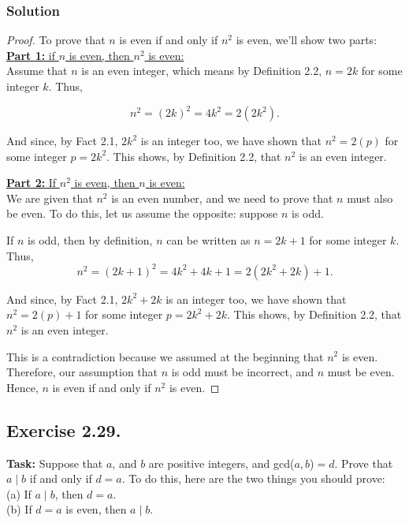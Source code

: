 \documentclass{article}
\begin{document}
\subsubsection*{Solution}

\begin{proof}
    To prove that $n$ is even if and only if $n^2$ is even, we'll show two parts:\\

    \underline{\textbf{Part 1:} if $n$ is even, then $n^2$ is even:}\\
    Assume that $n$ is an even integer, which means by Definition 2.2, $n=2k$ for some integer $k$. Thus,

    \[n^2=(2k)^2=4k^2=2(2k^2).\]

    And since, by Fact 2.1, $2k^2$ is an integer too, we have shown that $n^2=2(p)$ for some integer $p=2k^2$. This shows, by Definition 2.2, that $n^2$ is an even integer.

    \underline{\textbf{Part 2:} If $n^2$ is even, then $n$ is even:}\\
We are given that $n^2$ is an even number, and we need to prove that $n$ must also be even. To do this, let us assume the opposite: suppose $n$ is odd. 

If $n$ is odd, then by definition, $n$ can be written as $n = 2k + 1$ for some integer $k$. Thus,
\[
n^2 = (2k + 1)^2 = 4k^2 + 4k + 1 = 2(2k^2 + 2k) + 1.
\]

And since, by Fact 2.1, $2k^2+2k$ is an integer too, we have shown that $n^2=2(p)+1$ for some integer $p=2k^2+2k$. This shows, by Definition 2.2, that $n^2$ is an even integer.

This is a contradiction because we assumed at the beginning that $n^2$ is even. Therefore, our assumption that $n$ is odd must be incorrect, and $n$ must be even.\\

    Hence, $n$ is even if and only if $n^2$ is even.
\end{proof}

\newpage

\subsection{Exercise 2.29.}
\textbf{Task:} Suppose that $a$, and $b$ are positive integers, and gcd($a,b$)$=d$. Prove that $a\mid b$ if and only if $d=a$. To do this, here are the two things you should prove:\\
(a) If $a\mid b$, then $d=a$.\\
(b) If $d=a$ is even, then $a\mid b$.
\end{document}

